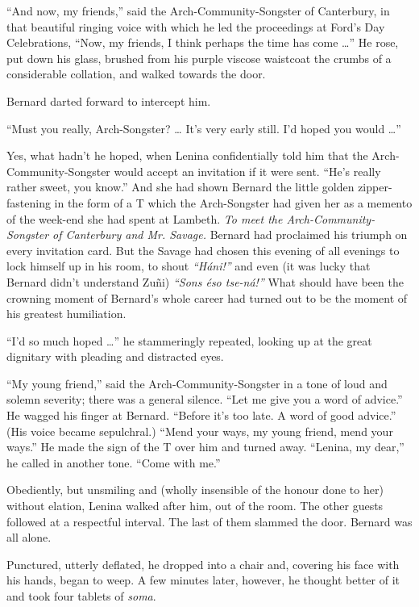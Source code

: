 \documentclass[12pt]{report}
\begin{document}
``And now, my friends,'' said the Arch-Community-Songster of Canterbury,
in that beautiful ringing voice with which he led the proceedings at
Ford's Day Celebrations, ``Now, my friends, I think perhaps the time has
come \ldots{}'' He rose, put down his glass, brushed from his purple
viscose waistcoat the crumbs of a considerable collation, and walked
towards the door.

Bernard darted forward to intercept him.

``Must you really, Arch-Songster? \ldots{} It's very early still. I'd
hoped you would \ldots{}''

Yes, what hadn't he hoped, when Lenina confidentially told him that the
Arch-Community-Songster would accept an invitation if it were sent.
``He's really rather sweet, you know.'' And she had shown Bernard the
little golden zipper-fastening in the form of a T which the
Arch-Songster had given her as a memento of the week-end she had spent
at Lambeth. \emph{To meet the Arch-Community-Songster of Canterbury and
Mr. Savage.} Bernard had proclaimed his triumph on every invitation
card. But the Savage had chosen this evening of all evenings to lock
himself up in his room, to shout \emph{``Háni!''} and even (it was lucky
that Bernard didn't understand Zuñi) \emph{``Sons éso tse-ná!''} What
should have been the crowning moment of Bernard's whole career had
turned out to be the moment of his greatest humiliation.

``I'd so much hoped \ldots{}'' he stammeringly repeated, looking up at
the great dignitary with pleading and distracted eyes.

``My young friend,'' said the Arch-Community-Songster in a tone of loud
and solemn severity; there was a general silence. ``Let me give you a
word of advice.'' He wagged his finger at Bernard. ``Before it's too
late. A word of good advice.'' (His voice became sepulchral.) ``Mend
your ways, my young friend, mend your ways.'' He made the sign of the T
over him and turned away. ``Lenina, my dear,'' he called in another
tone. ``Come with me.''

Obediently, but unsmiling and (wholly insensible of the honour done to
her) without elation, Lenina walked after him, out of the room. The
other guests followed at a respectful interval. The last of them slammed
the door. Bernard was all alone.

Punctured, utterly deflated, he dropped into a chair and, covering his
face with his hands, began to weep. A few minutes later, however, he
thought better of it and took four tablets of \emph{soma}.
\end{document}

